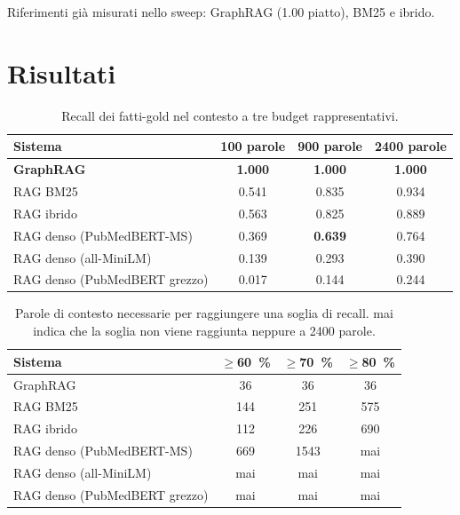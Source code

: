 \documentclass[11pt,a4paper]{report}
\begin{document}
Riferimenti già misurati nello sweep: GraphRAG (\num{1,00} piatto), BM25 e
ibrido.

\section{Risultati}

\begin{table}[H]
\centering
\begin{tabular}{@{}lccc@{}}
\toprule
\textbf{Sistema} & \textbf{\num{100} parole} & \textbf{\num{900} parole} & \textbf{\num{2400} parole} \\
\midrule
\textbf{GraphRAG} & \textbf{\num{1,000}} & \textbf{\num{1,000}} & \textbf{\num{1,000}} \\
RAG BM25 & \num{0,541} & \num{0,835} & \num{0,934} \\
RAG ibrido & \num{0,563} & \num{0,825} & \num{0,889} \\
RAG denso (PubMedBERT-MS) & \num{0,369} & \textbf{\num{0,639}} & \num{0,764} \\
RAG denso (all-MiniLM) & \num{0,139} & \num{0,293} & \num{0,390} \\
RAG denso (PubMedBERT grezzo) & \num{0,017} & \num{0,144} & \num{0,244} \\
\bottomrule
\end{tabular}
\caption{Recall dei fatti-gold nel contesto a tre budget rappresentativi.}
\end{table}

\begin{table}[H]
\centering
\begin{tabular}{@{}lccc@{}}
\toprule
\textbf{Sistema} & \textbf{$\geq$\SI{60}{\percent}} & \textbf{$\geq$\SI{70}{\percent}} & \textbf{$\geq$\SI{80}{\percent}} \\
\midrule
GraphRAG & \num{36} & \num{36} & \num{36} \\
RAG BM25 & \num{144} & \num{251} & \num{575} \\
RAG ibrido & \num{112} & \num{226} & \num{690} \\
RAG denso (PubMedBERT-MS) & \num{669} & \num{1543} & mai \\
RAG denso (all-MiniLM) & mai & mai & mai \\
RAG denso (PubMedBERT grezzo) & mai & mai & mai \\
\bottomrule
\end{tabular}
\caption{Parole di contesto necessarie per raggiungere una soglia di recall.
\guillemotleft{}mai\guillemotright{} indica che la soglia non viene raggiunta neppure a \num{2400} parole.}
\end{table}
\end{document}
